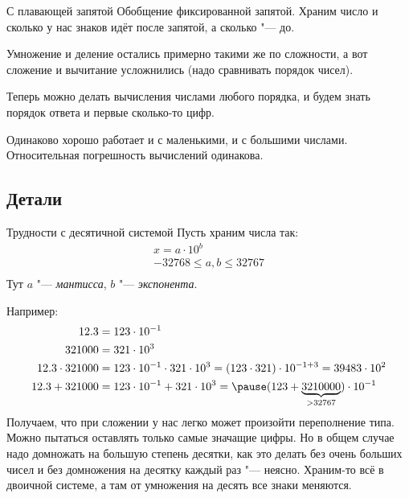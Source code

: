 \begin{frame}{С плавающей запятой}
	Обобщение фиксированной запятой.
	Храним число и сколько у нас знаков идёт после запятой, а сколько "--- до.

	Умножение и деление остались примерно такими же по сложности, а вот сложение и вычитание усложнились (надо сравнивать порядок чисел).

	Теперь можно делать вычисления числами любого порядка, и будем знать порядок ответа и первые сколько-то цифр.

	Одинаково хорошо работает и с маленькими, и с большими числами.
	Относительная погрешность вычислений одинакова.
\end{frame}

\subsection{Детали}
\begin{frame}{Трудности с десятичной системой}
	Пусть храним числа так:
	\begin{gather*}
		x = a \cdot 10^{b} \\
		-32768 \le a, b \le 32767 \\
	\end{gather*}
	Тут $a$ "--- \textit{мантисса}, $b$ "--- \textit{экспонента}.

	Например:
	\begin{align*}
		12.3 &= 123 \cdot 10^{-1} \\
		321000 &= 321 \cdot 10^3 \\
		12.3 \cdot 321000 &= 123 \cdot 10^{-1} \cdot 321 \cdot 10^3 = (123 \cdot 321) \cdot 10^{-1+3} = 39483 \cdot 10^2 \\
		12.3 + 321000 &= 123 \cdot 10^{-1} + 321 \cdot 10^3 = \pause (123 + \underbrace{3210000}_{>32767}) \cdot 10^{-1}
	\end{align*}
	Получаем, что при сложении у нас легко может произойти переполнение типа.
	Можно пытаться оставлять только самые значащие цифры.
	Но в общем случае надо домножать на большую степень десятки, как это делать без очень больших чисел и без домножения на десятку каждый раз "--- неясно.
	Храним-то всё в двоичной системе, а там от умножения на десять все знаки меняются.
\end{frame}

